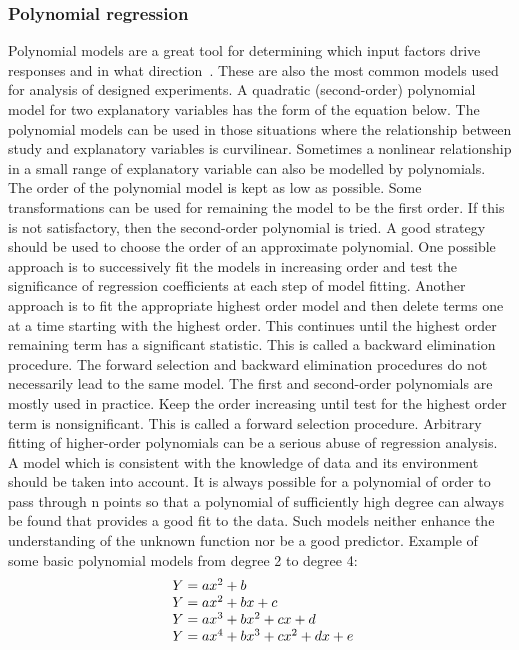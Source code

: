 \subsubsection{Polynomial regression} \label{sec:poly}
Polynomial models are a great tool for determining which input factors drive responses and in what direction~\cite{poly}.
These are also the most common models used for analysis of designed experiments.
A quadratic (second-order) polynomial model for two explanatory variables has the form of the equation below.
The polynomial models can be used in those situations where the relationship between study and explanatory variables is curvilinear.
Sometimes a nonlinear relationship in a small range of explanatory variable can also be modelled by polynomials.
The order of the polynomial model is kept as low as possible.
Some transformations can be used for remaining the model to be the first order.
If this is not satisfactory, then the second-order polynomial is tried.
A good strategy should be used to choose the order of an approximate polynomial.
One possible approach is to successively fit the models in increasing order and test the significance of regression coefficients at each step of model fitting.
Another approach is to fit the appropriate highest order model and then delete terms one at a time starting with the highest order.
This continues until the highest order remaining term has a significant statistic.
This is called a backward elimination procedure.
The forward selection and backward elimination procedures do not necessarily lead to the same model.
The first and second-order polynomials are mostly used in practice.
Keep the order increasing until test for the highest order term is nonsignificant.
This is called a forward selection procedure.
Arbitrary fitting of higher-order polynomials can be a serious abuse of regression analysis.
A model which is consistent with the knowledge of data and its environment should be taken into account.
It is always possible for a polynomial of order to pass through n points so that a polynomial of sufficiently high degree can always be found that provides a good fit to the data.
Such models neither enhance the understanding of the unknown function nor be a good predictor.
Example of some basic polynomial models from degree 2 to degree 4:\\
\begin{equation} \label{eq:5}
\begin{array}{l@{}l}
	Y = ax^2 + b\\
	Y = ax^2 + bx + c\\
	Y = ax^3 + bx^2 + cx + d\\
	Y = ax^4 + bx^3 + cx^2 + dx + e\\
\end{array}
\end{equation}

